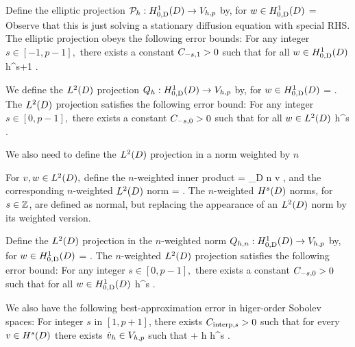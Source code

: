 Define the elliptic projection $\Ph:\HozDD\rightarrow\Vhp$ by, for $w \in \HozDD$
\beqs
{} =  \tforall \vh \in \Vhp
\eeqs
Observe that this is just solving a stationary diffusion equation with special RHS.
The elliptic projection obeys the following error bounds:
\label{lem:ellprojerr}
For any integer $s \in [-1,p-1],$ there exists a constant $C_{-s,1} >0$ such that for all $w \in \HozDD$
\beq\label{eq:ellprojerr}
 \leq \Cmso h^{s+1} .
\eeq
\ele{}

We define the $\LtD$ projection $\Qh:\HozDD\rightarrow \Vhp$ by, for $w \in \HozDD$
\beqs
{} =  \tforall \vh \in \Vhp.
\eeqs
The $\LtD$ projection satisfies the following error bound:
\label{lem:ltdprojerr}
For any integer $s \in [0,p-1],$ there exists a constant $C_{-s,0} >0$ such that for all $w \in \LtD$
\beqs
{} \leq \Cmso h^{s} .
\eeqs
\ele{}

We also need to define the $\LtD$ projection in a norm weighted by $n$

For $v,w \in \LtD,$ define the $n$-weighted inner product
\beqs
{} = \int_{D} n v \wbar,
\eeqs
and the corresponding $n$-weighted $\LtD$ norm
\beqs
{} = .
\eeqs
The $n$-weighted $\HsD$ norms, for $s \in \mathbb Z$, are defined as normal, but replacing the appearance of an $\LtD$ norm by its weighted version.

Define the $\LtD$ projection in the $n$-weighted norm $\Qhn:\HozDD\rightarrow \Vhp$ by, for $w \in \HozDD$
\beqs
{} =  \tforall \vh \in \Vhp.
\eeqs
The $n$-weighted $\LtD$ projection satisfies the following error bound:
\label{lem:wltdprojerr}
For any integer $s \in [0,p-1],$ there exists a constant $C_{-s,0} >0$ such that for all $w \in \HozDD$
\beq\label{eq:wltdprojerr}
 \leq \Cmso h^{s} .
\eeq
\ele{}

We also have the following best-approximation error in higer-order Sobolev spaces:
\label{lem:bestapproxhigh}
For integer $s$ in $[1,p+1]$, there exists $C_{\mathrm{interp},s}>0$ such that for every $v \in \HsD$ there exists $\hat{v}_{h} \in V_{h,p}$ such that
\beqs
{} + h \leq \Cinterps h^s .
\eeqs
\ele



